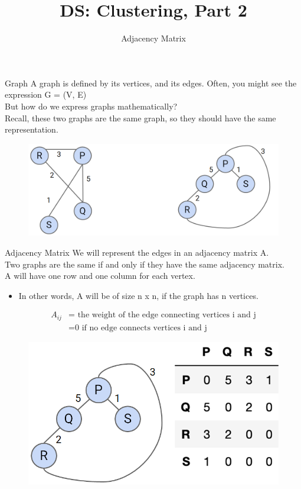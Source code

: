 \documentclass[aspectratio=169]{../latex_main/tntbeamer}  %
\title[Introduction]{DS: Clustering, Part 2}
\subtitle{Adjacency Matrix}
\begin{document}
	
	\maketitle
	\begin{frame}{Graph}
	    A graph is defined by its vertices, and its edges. Often, you might see the expression G = (V, E)\\
        But how do we express graphs mathematically?\\
        Recall, these two graphs are the same graph, so they should have the same representation.
        \begin{figure}
            \centering
            \includegraphics[scale=.5]{Bild11}
        \end{figure}
	\end{frame}
	
	
	\begin{frame}{Adjacency Matrix}
	   We will represent the edges in an adjacency matrix A.\\
      Two graphs are the same if and only if they have the same adjacency matrix.\\
      A will have one row and one column for each vertex.
        \begin{itemize}
            \item In other words, A will be of size n x n, if the graph has n vertices.
        \end{itemize}
        
        \begin{align*}
            A_{ij} &= \text{ the weight of the edge connecting vertices i and j} \\
                    &= \text{0 if no edge connects vertices i and j}
        \end{align*}
        \begin{figure}
            \centering
            \includegraphics[scale=.245]{Bild12}
        \end{figure}
	\end{frame}
	
\end{document}
